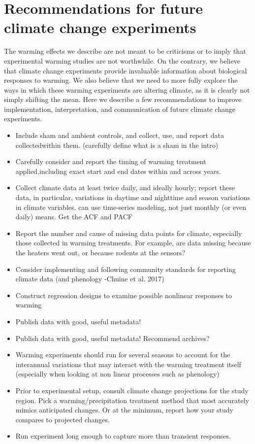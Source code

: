 \documentclass{article}
\begin{document}
\section {Recommendations for future climate change experiments}
 \par The warming effects we describe are not meant to be criticisms or to imply that experimental warming studies are not worthwhile. On the contrary, we believe that climate change experiments provide invaluable information about biological responses to warming. We also believe that we need to more fully explore the ways in which these warming experiments are altering climate, as it is clearly not simply shifting the mean. Here we describe a few recommendations to improve implementation, interpretation, and communication of future climate change experiments.
 \begin{itemize}

\item Include sham and ambient controls, and collect, use, and report data collectedwithin them. (carefully define what is a sham in the intro)
 \item Carefully consider and report the timing of warming treatment applied,including exact start and end dates within and across years.
 \item Collect climate data at least twice daily, and ideally hourly; report these data, in particular, variations in daytime and nighttime and season variations in climate variables. can use time-series modeling, not just monthly (or even daily) means. Get the ACF and PACF
\item Report the number and cause of missing data points for climate, especially
 those collected in warming treatments. For example, are data missing
 because the heaters went out, or because rodents at the sensors?
\item Consider implementing and following community standards for reporting
 climate data (and phenology -Chuine et al. 2017)
\item Construct regression designs to examine possible nonlinear responses to
 warming
\item Publish data with good, useful metadata!
\item Publish data with good, useful metadata! Recommend archives?
\item Warming experiments should run for several seasons to account for the interannual variations that may interact with the warming treatment itself (especially when looking at non linear processes such as phenology)
\item Prior to experimental setup, consult climate change projections for the study region.  Pick a warming/precipitation treatment method that most accurately mimics anticipated changes. Or at the minimum, report how your study compares to projected changes.
\item Run experiment long enough to capture more than transient responses.  
 \end{itemize}
\end{document}
